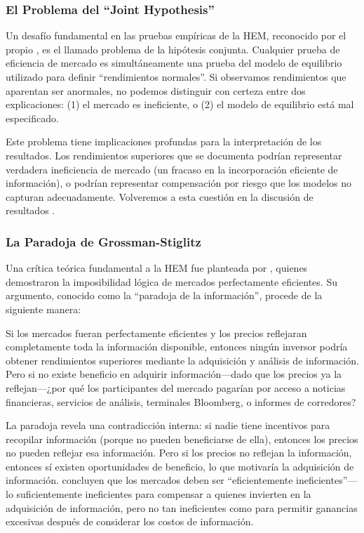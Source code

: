 \documentclass[11pt,a4paper]{article}
\begin{document}
\subsubsection{El Problema del ``Joint Hypothesis''}

Un desafío fundamental en las pruebas empíricas de la HEM, reconocido por el propio \citet{fama1991}, es el llamado problema de la hipótesis conjunta. Cualquier prueba de eficiencia de mercado es simultáneamente una prueba del modelo de equilibrio utilizado para definir ``rendimientos normales''. Si observamos rendimientos que aparentan ser anormales, no podemos distinguir con certeza entre dos explicaciones: (1) el mercado es ineficiente, o (2) el modelo de equilibrio está mal especificado.

Este problema tiene implicaciones profundas para la interpretación de los resultados. Los rendimientos superiores que se documenta podrían representar verdadera ineficiencia de mercado (un fracaso en la incorporación eficiente de información), o podrían representar compensación por riesgo que los modelos no capturan adecuadamente. Volveremos a esta cuestión en la discusión de resultados \citep{fama1991}.

\subsubsection{La Paradoja de Grossman-Stiglitz}

Una crítica teórica fundamental a la HEM fue planteada por \citet{grossman1980}, quienes demostraron la imposibilidad lógica de mercados perfectamente eficientes. Su argumento, conocido como la ``paradoja de la información'', procede de la siguiente manera:

Si los mercados fueran perfectamente eficientes y los precios reflejaran completamente toda la información disponible, entonces ningún inversor podría obtener rendimientos superiores mediante la adquisición y análisis de información. Pero si no existe beneficio en adquirir información---dado que los precios ya la reflejan---¿por qué los participantes del mercado pagarían por acceso a noticias financieras, servicios de análisis, terminales Bloomberg, o informes de corredores?

La paradoja revela una contradicción interna: si nadie tiene incentivos para recopilar información (porque no pueden beneficiarse de ella), entonces los precios no pueden reflejar esa información. Pero si los precios no reflejan la información, entonces sí existen oportunidades de beneficio, lo que motivaría la adquisición de información. \citet{grossman1980} concluyen que los mercados deben ser ``eficientemente ineficientes''---lo suficientemente ineficientes para compensar a quienes invierten en la adquisición de información, pero no tan ineficientes como para permitir ganancias excesivas después de considerar los costos de información.
\end{document}
